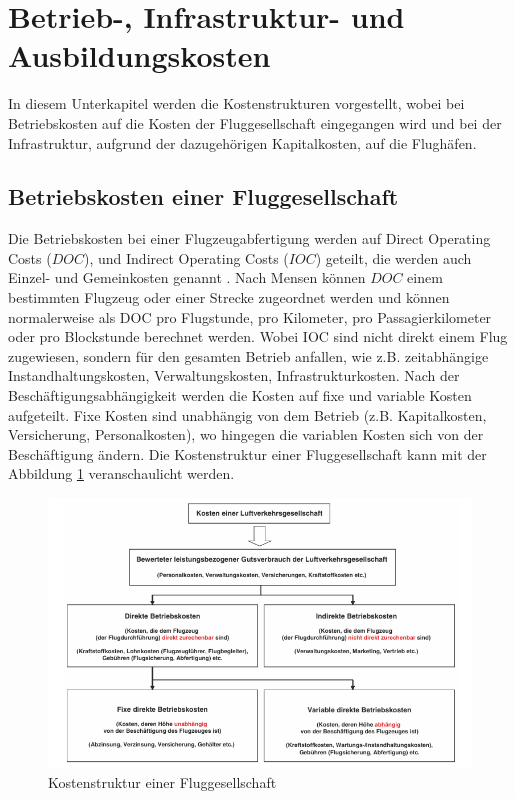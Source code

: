\section{Betrieb-, Infrastruktur- und Ausbildungskosten}
\label{s:Kosten}
In diesem Unterkapitel werden die Kostenstrukturen vorgestellt, 
wobei bei Betriebskosten auf die Kosten der Fluggesellschaft
eingegangen wird und bei der Infrastruktur, aufgrund der dazugehörigen Kapitalkosten, auf die Flughäfen.
%
\subsection{Betriebskosten einer Fluggesellschaft}

Die Betriebskosten bei einer Flugzeugabfertigung werden auf Direct Operating Costs ($DOC$), und Indirect Operating Costs 
($IOC$) geteilt, die werden auch Einzel- und Gemeinkosten genannt \cite{conrady2019luftverkehr}. 
Nach Mensen \cite{mensen2013handbuch} können $DOC$ einem bestimmten Flugzeug oder einer Strecke zugeordnet 
werden und können normalerweise als DOC pro Flugstunde, pro Kilometer, pro Passagierkilometer oder pro Blockstunde 
berechnet werden. Wobei IOC sind nicht direkt einem Flug zugewiesen, sondern für den gesamten Betrieb anfallen, wie z.B. zeitabhängige 
Instandhaltungskosten, Verwaltungskosten, Infrastrukturkosten. Nach der Beschäftigungsabhängigkeit werden die Kosten auf fixe und variable Kosten aufgeteilt. 
Fixe Kosten sind unabhängig von dem Betrieb (z.B. Kapitalkosten, Versicherung, Personalkosten), wo hingegen die variablen Kosten sich 
von der Beschäftigung ändern.
%
Die Kostenstruktur einer Fluggesellschaft kann mit der Abbildung \ref{doc} veranschaulicht werden.
%
\begin{figure}[h]
	\centering
	\includegraphics[width=0.9\linewidth]{Bilder/Systematik der DOC_Berechnung.png}
	\caption[Kostenstruktur einer Fluggesellschaft]{Kostenstruktur einer Fluggesellschaft \cite{mensen2013handbuch}}
	\label{doc}
\end{figure}

